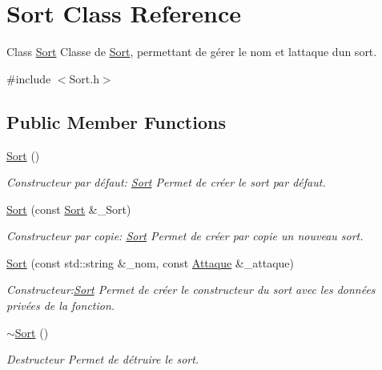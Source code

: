 \hypertarget{classSort}{}\section{Sort Class Reference}
\label{classSort}


Class \hyperlink{classSort}{Sort} Classe de \hyperlink{classSort}{Sort}, permettant de gérer le nom et l\textquotesingle{}attaque d\textquotesingle{}un sort.  




{\ttfamily \#include $<$Sort.\+h$>$}

\subsection*{Public Member Functions}
\begin{DoxyCompactItemize}
\item 
\hyperlink{classSort_a89ab0e273ec62afb2c1a3b7fc5671503}{Sort} ()
\begin{DoxyCompactList}\small\item\em Constructeur par défaut\+: \hyperlink{classSort}{Sort} Permet de créer le sort par défaut. \end{DoxyCompactList}\item 
\hyperlink{classSort_a0b765452defe7f6f0c6fe4dbec471e7c}{Sort} (const \hyperlink{classSort}{Sort} \&\+\_\+\+Sort)
\begin{DoxyCompactList}\small\item\em Constructeur par copie\+: \hyperlink{classSort}{Sort} Permet de créer par copie un nouveau sort. \end{DoxyCompactList}\item 
\hyperlink{classSort_ac50c836a5f2a6a74665a898d4af24e0a}{Sort} (const std\+::string \&\+\_\+nom, const \hyperlink{classAttaque}{Attaque} \&\+\_\+attaque)
\begin{DoxyCompactList}\small\item\em Constructeur\+:\hyperlink{classSort}{Sort} Permet de créer le constructeur du sort avec les données privées de la fonction. \end{DoxyCompactList}\item 
\mbox{\label{classSort_a8328ac58a93111896221c259baf8b874}} 
\hyperlink{classSort_a8328ac58a93111896221c259baf8b874}{$\sim$\+Sort} ()
\begin{DoxyCompactList}\small\item\em Destructeur Permet de détruire le sort. \end{DoxyCompactList}\item 

\end{DoxyCompactItemize}
